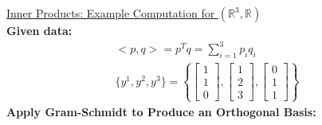 \documentclass[11pt,twoside]{nsf_jwg}
\newcommand{\RR}{{\mathbb{R}}}
\begin{document}
\newpage

\noindent
\underline{Inner Products: Example Computation for $(\RR^3,\RR)$}\\
\textbf{Given data:}
\begin{gather*}
	<p,q> = p^T q = \sum_{i=1}^3 p_i q_i \\
	\{ y^1, y^2, y^3 \} = \left\{
		\left[ \begin{array}{c} 1 \\ 1 \\ 0 \end{array} \right],
		\left[ \begin{array}{c} 1 \\ 2 \\ 3 \end{array} \right],
		\left[ \begin{array}{c} 0 \\ 1 \\ 1 \end{array} \right]
		\right\}
\end{gather*}
\textbf{Apply Gram-Schmidt to Produce an Orthogonal Basis:}
\end{document}
